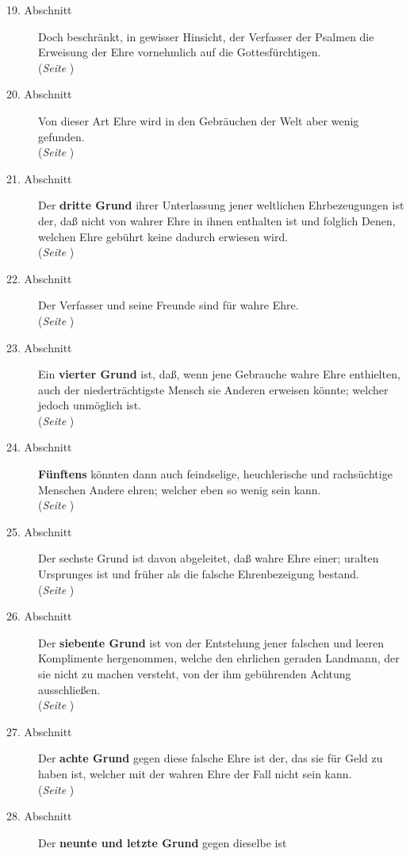 \begin{description}
\item[19. Abschnitt] Doch beschränkt, in gewisser Hinsicht, der Verfasser der
Psalmen die Erweisung der Ehre vornehmlich auf die Gottesfürchtigen.
\\ (\textit{Seite \pageref{kap9_ab19}})
\item[20. Abschnitt] Von dieser Art Ehre wird in den Gebräuchen der Welt aber
wenig gefunden.
\\ (\textit{Seite \pageref{kap9_ab20}})
\item[21. Abschnitt] Der \textbf{dritte Grund} ihrer Unterlassung jener
weltlichen
Ehrbezeugungen ist der, daß nicht von wahrer Ehre in ihnen enthalten ist und
folglich Denen, welchen Ehre gebührt keine dadurch erwiesen wird.
\\ (\textit{Seite \pageref{kap9_ab21}})
\item[22. Abschnitt] Der Verfasser und seine Freunde sind für wahre Ehre.
\\ (\textit{Seite \pageref{kap9_ab22}})
\item[23. Abschnitt] Ein \textbf{vierter Grund} ist, daß, wenn jene Gebrauche
wahre Ehre
enthielten, auch der niederträchtigste Mensch sie Anderen erweisen könnte;
welcher jedoch unmöglich ist.
\\ (\textit{Seite \pageref{kap9_ab23}})
\item[24. Abschnitt] \textbf{Fünftens} könnten dann auch feindselige,
heuchlerische und
rachsüchtige Menschen Andere ehren; welcher eben so wenig sein kann.
\\ (\textit{Seite \pageref{kap9_ab24}})
\item[25. Abschnitt] Der sechste Grund ist davon abgeleitet, daß wahre Ehre
einer; uralten Ursprunges ist und früher als die falsche Ehrenbezeigung bestand.
\\ (\textit{Seite \pageref{kap9_ab25}})
\item[26. Abschnitt] Der \textbf{siebente Grund} ist von der Entstehung jener
falschen
und leeren Komplimente hergenommen, welche den ehrlichen geraden Landmann, der
sie nicht zu machen versteht, von der ihm gebührenden Achtung ausschließen.
\\ (\textit{Seite \pageref{kap9_ab26}})
\item[27. Abschnitt] Der \textbf{achte Grund} gegen diese falsche Ehre ist der,
das sie
für Geld zu haben ist, welcher mit der wahren Ehre der Fall nicht sein kann.
\\ (\textit{Seite \pageref{kap9_ab27}})
\item[28. Abschnitt] Der \textbf{neunte und letzte Grund} gegen dieselbe ist

\end{description}
